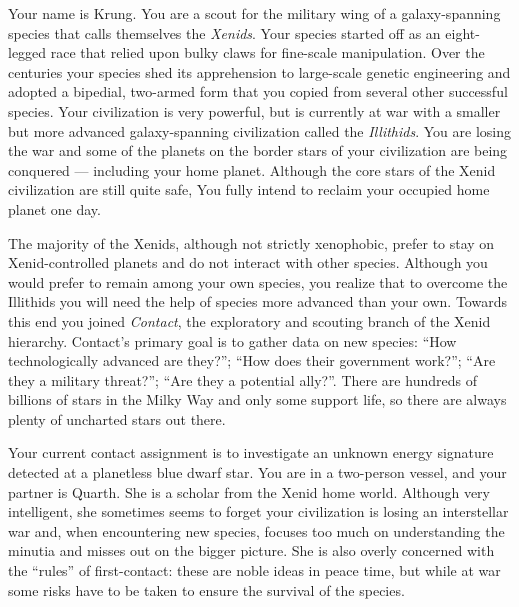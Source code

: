\documentclass[char]{guildcamp1}
\begin{document}
\name{\cActive{}}


Your name is Krung. You are a scout for the military wing of a galaxy-spanning species that calls themselves the \emph{Xenids}. Your species started off as an eight-legged race that relied upon bulky claws for fine-scale manipulation. Over the centuries your species shed its apprehension to large-scale genetic engineering and adopted a bipedial, two-armed form that you copied from several other successful species. Your civilization is very powerful, but is currently at war with a smaller but more advanced galaxy-spanning civilization called the \emph{Illithids}. You are losing the war and some of the planets on the border stars of your civilization are being conquered --- including your home planet. Although the core stars of the Xenid civilization are still quite safe, You fully intend to reclaim your occupied home planet one day.

The majority of the Xenids, although not strictly xenophobic, prefer to stay on Xenid-controlled planets and do not interact with other species. Although you would prefer to remain among your own species, you realize that to overcome the Illithids you will need the help of species more advanced than your own. Towards this end you joined \emph{Contact}, the exploratory and scouting branch of the Xenid hierarchy. Contact's primary goal is to gather data on new species: ``How technologically advanced are they?''; ``How does their government work?''; ``Are they a military threat?''; ``Are they a potential ally?''. There are hundreds of billions of stars in the Milky Way and only some support life, so there are always plenty of uncharted stars out there.

Your current contact assignment is to investigate an unknown energy signature detected at a planetless blue dwarf star. You are in a two-person vessel, and your partner is Quarth. She is a scholar from the Xenid home world. Although very intelligent, she sometimes seems to forget your civilization is losing an interstellar war and, when encountering new species, focuses too much on understanding the minutia and misses out on the bigger picture. She is also overly concerned with the ``rules'' of first-contact: these are noble ideas in peace time, but while at war some risks have to be taken to ensure the survival of the species.
\end{document}
